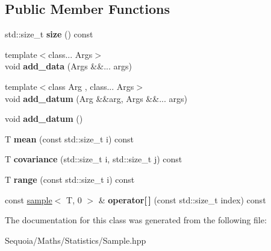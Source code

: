 \subsection*{Public Member Functions}
\begin{DoxyCompactItemize}
\item 
\mbox{\label{classsequoia_1_1statistics_1_1sample_ac5091cb19473e80d0fe1005143981678}} 
std\+::size\+\_\+t {\bfseries size} () const
\item 
\mbox{\label{classsequoia_1_1statistics_1_1sample_a208a7cf8b4096a67bf9a7241a1c58849}} 
{\footnotesize template$<$class... Args$>$ }\\void {\bfseries add\+\_\+data} (Args \&\&... args)
\item 
\mbox{\label{classsequoia_1_1statistics_1_1sample_ac04cb9aa21b70a75ebec3a39db2bd982}} 
{\footnotesize template$<$class Arg , class... Args$>$ }\\void {\bfseries add\+\_\+datum} (Arg \&\&arg, Args \&\&... args)
\item 
\mbox{\label{classsequoia_1_1statistics_1_1sample_a2ff94f638af9c22f87d0b5084513b1a1}} 
void {\bfseries add\+\_\+datum} ()
\item 
\mbox{\label{classsequoia_1_1statistics_1_1sample_ab74e4f49170f8df157607dc17c261f5b}} 
T {\bfseries mean} (const std\+::size\+\_\+t i) const
\item 
\mbox{\label{classsequoia_1_1statistics_1_1sample_a84b4b604fc96cb83db62f736f5d6ccde}} 
T {\bfseries covariance} (std\+::size\+\_\+t i, std\+::size\+\_\+t j) const
\item 
\mbox{\label{classsequoia_1_1statistics_1_1sample_aaadc255365b7204120ce7e4f17d1181e}} 
T {\bfseries range} (const std\+::size\+\_\+t i) const
\item 
\mbox{\label{classsequoia_1_1statistics_1_1sample_af4d6b615de6bc33cb0d68635d6231752}} 
const \mbox{\hyperlink{classsequoia_1_1statistics_1_1sample}{sample}}$<$ T, 0 $>$ \& {\bfseries operator\mbox{[}$\,$\mbox{]}} (const std\+::size\+\_\+t index) const
\end{DoxyCompactItemize}


The documentation for this class was generated from the following file\+:\begin{DoxyCompactItemize}
\item 
Sequoia/\+Maths/\+Statistics/Sample.\+hpp\end{DoxyCompactItemize}
